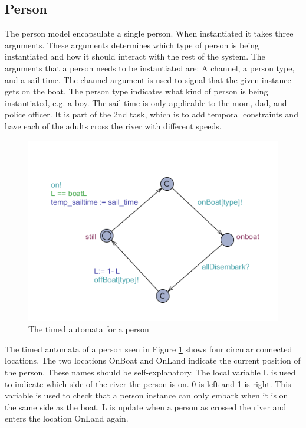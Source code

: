 \subsection{Person}
The person model encapsulate a single person.
When instantiated it takes three arguments.
These arguments determines which type of person is being instantiated and how it should interact with the rest of the system.
The arguments that a person needs to be instantiated are: A channel, a person type, and a sail time.
The channel argument is used to signal that the given instance gets on the boat.
The person type indicates what kind of person is being instantiated, e.g. a boy.
The sail time is only applicable to the mom, dad, and police officer.
It is part of the 2nd task, which is to add temporal constraints and have each of the adults cross the river with different speeds.
\begin{figure}%
\includegraphics[width=\columnwidth]{pictures/person.png}%
\caption{The timed automata for a person}%
\label{fig:person}%
\end{figure}

The timed automata of a person seen in Figure \ref{fig:person} shows four circular connected locations.
The two locations OnBoat and OnLand indicate the current position of the person.
These names should be self-explanatory.
The local variable L is used to indicate which side of the river the person is on.
0 is left and 1 is right.
This variable is used to check that a person instance can only embark when it is on the same side as the boat.
L is update when a person as crossed the river and enters the location OnLand again.

